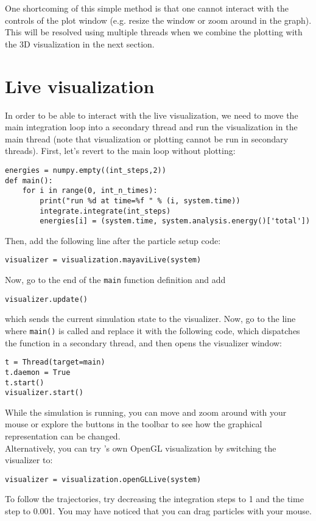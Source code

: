 \documentclass[
paper=a4,                       %
fontsize=11pt,                  %
twoside,                        %
footsepline,                    %
headsepline,                    %
headinclude=false,              %
footinclude=false,              %
pagesize,                       %
]{scrartcl}
\begin{document}
\noindent One shortcoming of this simple method is that one cannot interact with the controls of the plot window (e.g. resize the window or zoom around in the graph).
This will be resolved using multiple threads when we combine the plotting with the 3D visualization in the next section.

\section{Live visualization}
\label{vis}

In order to be able to interact with the live visualization, we need to move the main integration loop into a secondary thread and run the visualization in the main thread (note that visualization or plotting cannot be run in secondary threads). First, let's revert to the main loop without plotting:
\begin{lstlisting}
energies = numpy.empty((int_steps,2))
def main():
    for i in range(0, int_n_times):
        print("run %d at time=%f " % (i, system.time))
        integrate.integrate(int_steps)
        energies[i] = (system.time, system.analysis.energy()['total'])
\end{lstlisting}

Then, add the following line after the particle setup code:
\begin{lstlisting}
visualizer = visualization.mayaviLive(system)
\end{lstlisting}
Now, go to the end of the \lstinline{main} function definition and add
\begin{lstlisting}
visualizer.update()
\end{lstlisting}
which sends the current simulation state to the visualizer.
Now, go to the line where \lstinline{main()} is called and replace it with the following code, which dispatches the function in a secondary thread, and then opens the visualizer window:
\begin{lstlisting}
t = Thread(target=main)
t.daemon = True
t.start()
visualizer.start()
\end{lstlisting}
While the simulation is running, you can move and zoom around with your mouse or explore the buttons in the toolbar to see how the graphical representation can be changed.\\

\noindent Alternatively, you can try \es's own OpenGL visualization by switching the visualizer to:
\begin{lstlisting}
visualizer = visualization.openGLLive(system)
\end{lstlisting}
To follow the trajectories, try decreasing the integration steps to 1 and the time step to 0.001. 
You may have noticed that you can drag particles with your mouse. 
\end{document}

